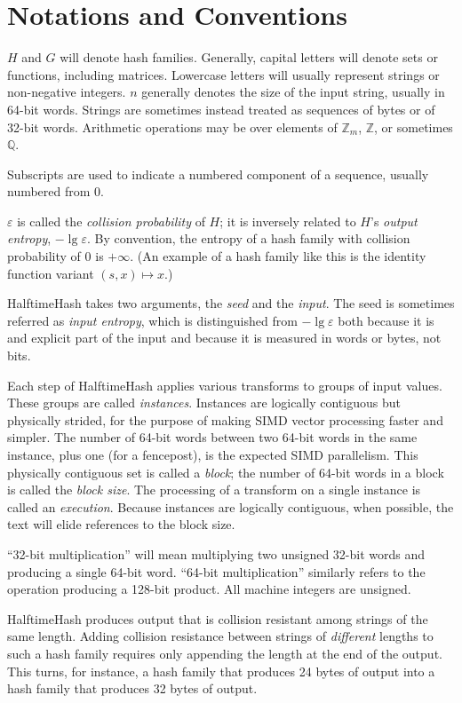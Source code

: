 \documentclass[sigconf, nonacm]{acmart}
\newcommand{\rats}{\mathbb{Q}}
\newcommand{\ints}{\mathbb{Z}}
\begin{document}
\section{Notations and Conventions}

$H$ and $G$ will denote hash families.
Generally, capital letters will denote sets or functions, including matrices.
Lowercase letters will usually represent strings or non-negative integers.
$n$ generally denotes the size of the input string, usually in 64-bit words.
Strings are sometimes instead treated as sequences of bytes or of 32-bit words.
Arithmetic operations may be over elements of $\ints_m$, $\ints$, or sometimes $\rats$.

Subscripts are used to indicate a numbered component of a sequence, usually numbered from 0.

$\varepsilon$ is called the {\em collision probability} of $H$; it is inversely related to $H$'s {\em output entropy}, $-\lg \varepsilon$.
By convention, the entropy of a hash family with collision probability of $0$ is $+\infty$.
(An example of a hash family like this is the identity function variant $(s, x) \mapsto x$.)

HalftimeHash takes two arguments, the {\em seed} and the {\em input}.
The seed is sometimes referred as {\em input entropy}, which is distinguished from $-\lg \varepsilon$ both because it is and explicit part of the input and because it is measured in words or bytes, not bits.

Each step of HalftimeHash applies various transforms to groups of input values.
These groups are called {\em instances}.
Instances are logically contiguous but physically strided, for the purpose of making SIMD vector processing faster and simpler.
The number of 64-bit words between two 64-bit words in the same instance, plus one (for a fencepost), is the expected SIMD parallelism.
This physically contiguous set is called a {\em block}; the number of 64-bit words in a block is called the {\em block size}.
The processing of a transform on a single instance is called an {\em execution}.
Because instances are logically contiguous, when possible, the text will elide references to the block size.

``32-bit multiplication'' will mean multiplying two unsigned 32-bit words and producing a single 64-bit word.
``64-bit multiplication'' similarly refers to the operation producing a 128-bit product.
All machine integers are unsigned.

HalftimeHash produces output that is collision resistant among strings of the same length.
Adding collision resistance between strings of {\em different} lengths to such a hash family requires only appending the length at the end of the output.
This turns, for instance, a hash family that produces 24 bytes of output into a hash family that produces 32 bytes of output.
\end{document}

